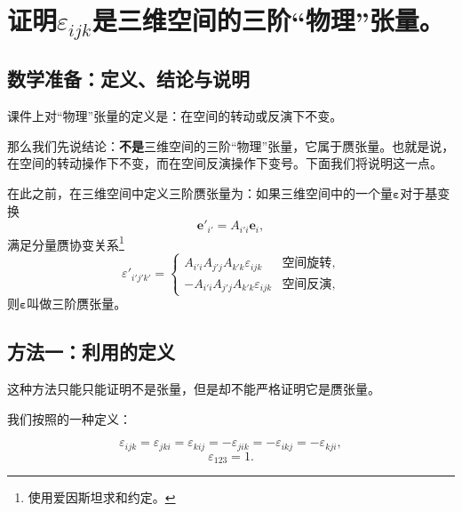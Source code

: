 \section{证明$\varepsilon_{ijk}$是三维空间的三阶“物理”张量。}

    \subsection{数学准备：定义、结论与说明}

    课件上对“物理”张量的定义是：在空间的转动或反演下不变。
    
    那么我们先说结论：\nota{\ep}\textbf{不是}三维空间的三阶“物理”张量，它属于赝张量。也就是说，\nota{\ep}在空间的转动操作下不变，而在空间反演操作下变号。下面我们将说明这一点。
    
    在此之前，在三维空间中定义三阶赝张量为：如果三维空间中的一个量$\mathbf{\varepsilon}$对于基变换
    \begin{equation}
        \bm{e}'_{i'}= A_{i'i} \bm{e}_i ,
        \label{0.1_基}
    \end{equation}
    满足分量赝协变关系\footnote{使用爱因斯坦求和约定。}
    \begin{equation}
        \varepsilon'_{i'j'k'} = 
        \begin{cases}
            A_{i'i}A_{j'j}A_{k'k} \varepsilon_{ijk} & \text{空间旋转},\\
            - A_{i'i}A_{j'j}A_{k'k} \varepsilon_{ijk} & \text{空间反演},
        \end{cases}
        \label{0.1_赝}
    \end{equation}
    则$\mathbf{\varepsilon}$叫做三阶赝张量。
    
    \subsection{方法一：利用\nota{\ep}的定义}
    
        这种方法只能只能证明\nota{\ep}不是张量，但是却不能严格证明它是赝张量。
        
        我们按照\nota{\ep}的一种定义：
        
            \begin{equation}
                \varepsilon_{ijk} = \varepsilon_{jki} = \varepsilon_{kij} = -\varepsilon_{jik} = -\varepsilon_{ikj} = -\varepsilon_{kji}, \label{0.1_对称}
            \end{equation}
            \begin{equation}
                \varepsilon_{123} = 1 \label{0.1_1}.
            \end{equation}
        
